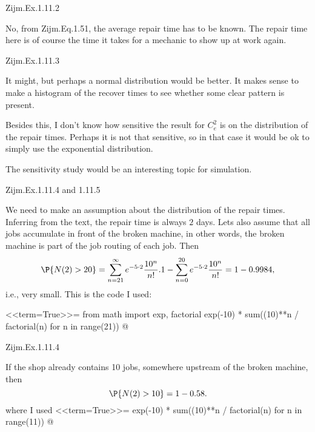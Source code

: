 \begin{question}
Zijm.Ex.1.11.2
 \begin{solution}
   No, from Zijm.Eq.1.51, the average repair time has to be known. The
   repair time here is of course the time it takes for a mechanic to
   show up at work again.
\end{solution}
\end{question}
\begin{question}
Zijm.Ex.1.11.3
 \begin{solution}
   It might, but perhaps a normal distribution would be better. It
   makes sense to make a histogram of the recover times to see whether
   some clear pattern is present. 

   Besides this, I don't know how sensitive the result for $C_e^2$ is
   on the distribution of the repair times. Perhaps it is not that
   sensitive, so in that case it would be ok to simply use the
   exponential distribution. 

The sensitivity study would be an interesting topic for simulation. 
\end{solution}
\end{question}
\begin{question}
Zijm.Ex.1.11.4 and 1.11.5
 \begin{solution}
   We need to make an assumption about the distribution of the repair
   times. Inferring from the text, the repair time is always $2$
   days. Lets also assume that all jobs accumulate in front of the
   broken machine, in other words, the broken machine is part of the
   job routing of each job. Then
   \begin{equation*}
     \P{N(2) > 20} = 
\sum_{n=21}^\infty e^{-5\cdot 2} \frac{10^n}{n!}.
1  - \sum_{n=0}^{20} e^{-5\cdot 2} \frac{10^n}{n!} = 1-0.9984,
   \end{equation*}
i.e., very small.  This is the code I used: 

<<term=True>>=
from math import exp, factorial
exp(-10) * sum((10)**n / factorial(n) for n in range(21))
@
\end{solution}
\end{question}

\begin{question}
Zijm.Ex.1.11.4

 \begin{solution}
If the shop already contains 10 jobs, somewhere upstream of the broken machine, then 
   \begin{equation*}
     \P{N(2) > 10} = 1- 0.58.
   \end{equation*}
where  I used
<<term=True>>=
exp(-10) * sum((10)**n / factorial(n) for n in range(11))
@
\end{solution}
\end{question}

